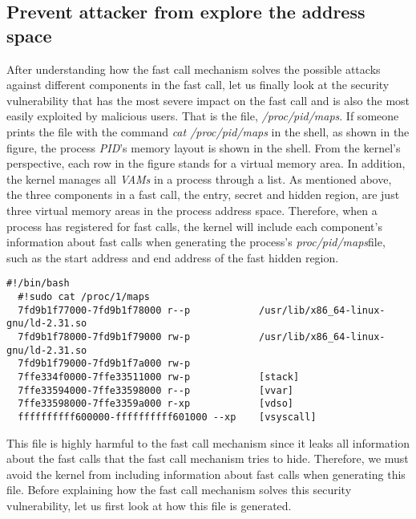 \subsection{Prevent attacker from explore the address space}
After understanding how the fast call mechanism solves the 
possible attacks against different components in the fast call, 
let us finally look at the security vulnerability that has the most 
severe impact on the fast call and is also the most easily exploited 
by malicious users. That is the file, \emph{/proc/pid/maps}.
If someone prints the file with the command \emph{cat /proc/pid/maps} in the shell, 
as shown in the figure, the process \emph{PID}'s memory layout is shown in the shell. 
From the kernel's perspective, each row in the figure stands for a virtual 
memory area. In addition, the kernel manages all \emph{VAMs} in a process through a list. 
As mentioned above, the three components in a fast call, the entry, secret and hidden region, are just 
three virtual memory areas in the process address space. Therefore, when 
a process has registered for fast calls, the kernel will include each 
component's information about fast calls when generating the process's 
\emph{proc/pid/maps}file, such as the start address and end address of the fast 
hidden region.


\begin{lstlisting}[style=BASHStyle]
  #!/bin/bash
  #!sudo cat /proc/1/maps
  7fd9b1f77000-7fd9b1f78000 r--p            /usr/lib/x86_64-linux-gnu/ld-2.31.so
  7fd9b1f78000-7fd9b1f79000 rw-p            /usr/lib/x86_64-linux-gnu/ld-2.31.so
  7fd9b1f79000-7fd9b1f7a000 rw-p  
  7ffe334f0000-7ffe33511000 rw-p            [stack]
  7ffe33594000-7ffe33598000 r--p            [vvar]
  7ffe33598000-7ffe3359a000 r-xp            [vdso]
  ffffffffff600000-ffffffffff601000 --xp    [vsyscall]
\end{lstlisting}


This file is highly harmful to the fast call mechanism since 
it leaks all information about the fast calls that the fast call 
mechanism tries to hide. Therefore, we must avoid the kernel from 
including information about fast calls when generating this file. 
Before explaining how the fast call mechanism solves this security 
vulnerability, let us first look at how this file is generated.

